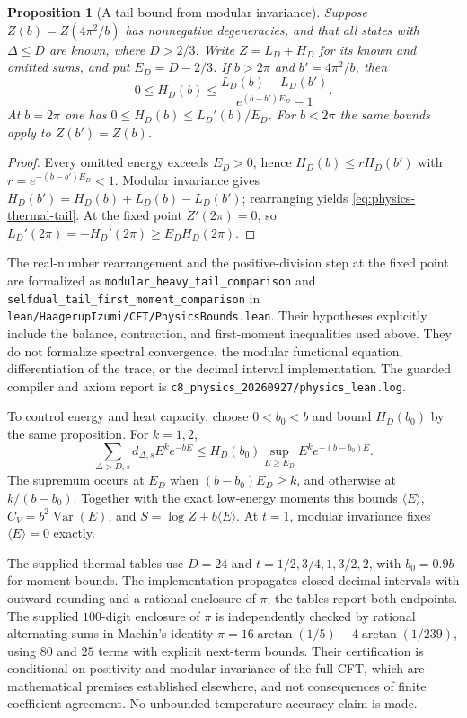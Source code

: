 \documentclass[11pt,a4paper]{article}
\newtheorem{proposition}[theorem]{Proposition}
\theoremstyle{definition}
\newcommand{\artifact}[1]{\textnormal{\nolinkurl{#1}}}
\begin{document}
\begin{proposition}[A tail bound from modular invariance]
\label{prop:physics-modular-tail}
Suppose $Z(b)=Z(4\pi^2/b)$ has nonnegative degeneracies, and that all
states with $\Delta\leq D$ are known, where $D>2/3$.  Write
$Z=L_D+H_D$ for its known and omitted sums, and put
$E_D=D-2/3$.  If $b>2\pi$ and $b'=4\pi^2/b$, then
\begin{equation}\label{eq:physics-thermal-tail}
 0\leq H_D(b)\leq
 \frac{L_D(b)-L_D(b')}{e^{(b-b')E_D}-1}.
\end{equation}
At $b=2\pi$ one has
$0\leq H_D(b)\leq L_D'(b)/E_D$.
For $b<2\pi$ the same bounds apply to $Z(b')=Z(b)$.
\end{proposition}
\begin{proof}
Every omitted energy exceeds $E_D>0$, hence
$H_D(b)\leq rH_D(b')$ with $r=e^{-(b-b')E_D}<1$.
Modular invariance gives
$H_D(b')=H_D(b)+L_D(b)-L_D(b')$; rearranging yields
\eqref{eq:physics-thermal-tail}.  At the fixed point $Z'(2\pi)=0$,
so $L_D'(2\pi)=-H_D'(2\pi)\geq E_DH_D(2\pi)$.
\end{proof}

The real-number rearrangement and the positive-division step at the
fixed point are formalized as
\artifact{modular_heavy_tail_comparison} and
\artifact{selfdual_tail_first_moment_comparison} in
\artifact{lean/HaagerupIzumi/CFT/PhysicsBounds.lean}.
Their hypotheses explicitly include the balance, contraction, and
first-moment inequalities used above. They do not formalize spectral
convergence, the modular functional equation, differentiation of
the trace, or the decimal interval implementation. The guarded
compiler and axiom report is
\artifact{c8_physics_20260927/physics_lean.log}.

To control energy and heat capacity, choose $0<b_0<b$ and bound
$H_D(b_0)$ by the same proposition.  For $k=1,2$,
\begin{equation}\label{eq:physics-moment-tail}
 \sum_{\Delta>D,s}d_{\Delta,s}E^ke^{-bE}
 \leq H_D(b_0)\sup_{E\geq E_D}E^ke^{-(b-b_0)E}.
\end{equation}
The supremum occurs at $E_D$ when $(b-b_0)E_D\geq k$, and otherwise
at $k/(b-b_0)$.  Together with the exact low-energy moments this bounds
$\langle E\rangle$, $C_V=b^2\operatorname{Var}(E)$, and
$S=\log Z+b\langle E\rangle$.  At $t=1$, modular invariance fixes
$\langle E\rangle=0$ exactly.

The supplied thermal tables use $D=24$ and
$t=1/2,3/4,1,3/2,2$, with $b_0=0.9b$ for moment bounds.
The implementation propagates closed decimal intervals with outward
rounding and a rational enclosure of $\pi$; the tables report both
endpoints. The supplied $100$-digit enclosure of $\pi$ is independently
checked by rational alternating sums in Machin's identity
$\pi=16\arctan(1/5)-4\arctan(1/239)$, using $80$ and $25$ terms
with explicit next-term bounds. Their certification is conditional on positivity and
modular invariance of the full CFT, which are mathematical premises
established elsewhere, and not consequences of finite coefficient
agreement.  No unbounded-temperature accuracy claim is made.
\end{document}
